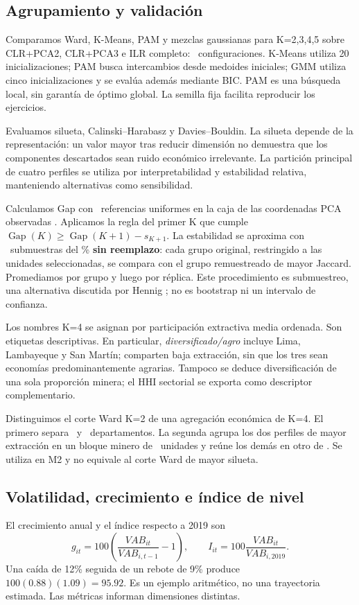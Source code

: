 \subsection{Agrupamiento y validación}
Comparamos Ward, K-Means, PAM y mezclas gaussianas para K=2,3,4,5 sobre CLR+PCA2, CLR+PCA3 e ILR completo: \SpecCount\ configuraciones. K-Means utiliza 20 inicializaciones; PAM busca intercambios desde medoides iniciales; GMM utiliza cinco inicializaciones y se evalúa además mediante BIC. PAM es una búsqueda local, sin garantía de óptimo global. La semilla fija facilita reproducir los ejercicios.

Evaluamos silueta, Calinski--Harabasz y Davies--Bouldin. La silueta depende de la representación: un valor mayor tras reducir dimensión no demuestra que los componentes descartados sean ruido económico irrelevante. La partición principal de cuatro perfiles se utiliza por interpretabilidad y estabilidad relativa, manteniendo alternativas como sensibilidad.

Calculamos Gap con \GapReplicas\ referencias uniformes en la caja de las coordenadas PCA observadas \cite{gap}. Aplicamos la regla del primer K que cumple $\operatorname{Gap}(K)\geq\operatorname{Gap}(K+1)-s_{K+1}$. La estabilidad se aproxima con \StabilityReplicas\ submuestras del \SubsamplePct\% \textbf{sin reemplazo}: cada grupo original, restringido a las unidades seleccionadas, se compara con el grupo remuestreado de mayor Jaccard. Promediamos por grupo y luego por réplica. Este procedimiento es submuestreo, una alternativa discutida por Hennig \cite{hennig}; no es bootstrap ni un intervalo de confianza.

Los nombres K=4 se asignan por participación extractiva media ordenada. Son etiquetas descriptivas. En particular, \textit{diversificado/agro} incluye Lima, Lambayeque y San Martín; comparten baja extracción, sin que los tres sean economías predominantemente agrarias. Tampoco se deduce diversificación de una sola proporción minera; el HHI sectorial se exporta como descriptor complementario.

Distinguimos el corte Ward K=2 de una agregación económica de K=4. El primero separa \WardSmallCount\ y \WardLargeCount\ departamentos. La segunda agrupa los dos perfiles de mayor extracción en un bloque minero de \MacroMiningCount\ unidades y reúne los demás en otro de \MacroOtherCount. Se utiliza en M2 y no equivale al corte Ward de mayor silueta.

\subsection{Volatilidad, crecimiento e índice de nivel}
El crecimiento anual y el índice respecto a 2019 son
\begin{equation}
g_{it}=100\left(\frac{VAB_{it}}{VAB_{i,t-1}}-1\right),\qquad I_{it}=100\frac{VAB_{it}}{VAB_{i,2019}}.
\end{equation}
Una caída de 12\% seguida de un rebote de 9\% produce $100(0.88)(1.09)=95.92$. Es un ejemplo aritmético, no una trayectoria estimada. Las métricas informan dimensiones distintas.

